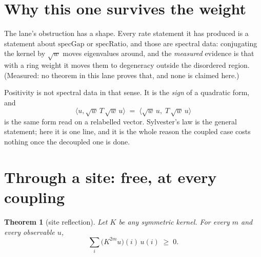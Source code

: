 \documentclass[11pt]{article}
\newtheorem{theorem}{Theorem}[section]
\theoremstyle{definition}
\newcommand{\SU}{\mathrm{SU}}
\begin{document}
\begin{abstract}
\textbf{What this is not.}  Neither the full axiom (above) nor any
reconstruction: the physical Hilbert space as the quotient of the past algebra
by the null space of this form is not built.  And the degeneration of
$\mathrm{specRatio}(L)$ under a ring weight is \emph{measured}, not proved; no
theorem here or elsewhere in the lane says the weight destroys uniformity, only
that no uniform bound is proved for it.  Nothing here concerns uniformity in the
extent, $\SU(N)$, the continuum limit, or the Yang--Mills mass gap \cite{Clay}.

\textbf{On the pre-registration.}  Three \emph{active} gates were committed
before any Lean was written, and \S\ref{sec:gates} reports what happened to
each.  A fourth is preserved there and not counted: the original Gate~B, which
failed because of a design error of ours, and which two of the three active
gates replaced.
\end{abstract}

\section{Why this one survives the weight}\label{sec:why}

The lane's obstruction has a shape.  Every rate statement it has produced is a
statement about $\mathrm{specGap}$ or $\mathrm{specRatio}$, and those are
spectral data: conjugating the kernel by $\sqrt{w}$ moves eigenvalues around,
and the \emph{measured} evidence is that with a ring weight it moves them to
degeneracy outside the disordered region.  (Measured: no theorem in this lane
proves that, and none is claimed here.)

Positivity is not spectral data in that sense.  It is the \emph{sign} of a
quadratic form, and
\[
  \langle u, \sqrt{w}\,T\,\sqrt{w}\, u\rangle
  \;=\; \langle \sqrt{w}\,u,\; T\, \sqrt{w}\,u\rangle
\]
is the same form read on a relabelled vector.  Sylvester's law is the general
statement; here it is one line, and it is the whole reason the coupled case
costs nothing once the decoupled one is done.

\section{Through a site: free, at every coupling}\label{sec:site}

\begin{theorem}[site reflection]\label{thm:site}
Let $K$ be any symmetric kernel.  For every $m$ and every observable $u$,
\[
  \sum_i \bigl(K^{2m} u\bigr)(i)\, u(i) \;\ge\; 0 .
\]
\end{theorem}
\end{document}

